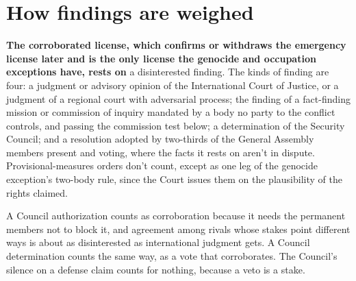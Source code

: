 \section{How findings are weighed}
\label{sec:B.1}
\textbf{The corroborated license, which confirms or withdraws the emergency license later and is the only license the genocide and occupation exceptions have, rests on} a disinterested finding. The kinds of finding are four: a judgment or advisory opinion of the International Court of Justice, or a judgment of a regional court with adversarial process; the finding of a fact-finding mission or commission of inquiry mandated by a body no party to the conflict controls, and passing the commission test below; a determination of the Security Council; and a resolution adopted by two-thirds of the General Assembly members present and voting, where the facts it rests on aren't in dispute. Provisional-measures orders don't count, except as one leg of the genocide exception's two-body rule, since the Court issues them on the plausibility of the rights claimed.

A Council authorization counts as corroboration because it needs the permanent members not to block it, and agreement among rivals whose stakes point different ways is about as disinterested as international judgment gets. A Council determination counts the same way, as a vote that corroborates. The Council's silence on a defense claim counts for nothing, because a veto is a stake.

